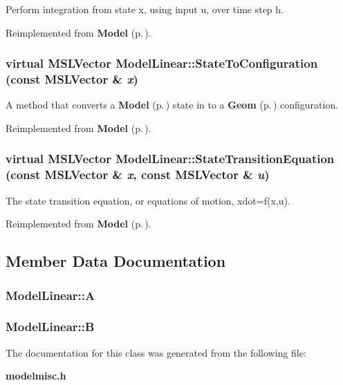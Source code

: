 Perform integration from state x, using input u, over time step h.



Reimplemented from {\bf Model} {\rm (p.\,\pageref{class_Model_a5})}.
\subsubsection{\setlength{\rightskip}{0pt plus 5cm}virtual {\bf MSLVector} Model\-Linear::State\-To\-Configuration (const {\bf MSLVector} \& {\em x})\hspace{0.3cm}{\tt  [virtual]}}\label{class_ModelLinear_a2}


A method that converts a {\bf Model} {\rm (p.\,\pageref{class_Model})} state in to a {\bf Geom} {\rm (p.\,\pageref{class_Geom})} configuration.



Reimplemented from {\bf Model} {\rm (p.\,\pageref{class_Model_a8})}.
\subsubsection{\setlength{\rightskip}{0pt plus 5cm}virtual {\bf MSLVector} Model\-Linear::State\-Transition\-Equation (const {\bf MSLVector} \& {\em x}, const {\bf MSLVector} \& {\em u})\hspace{0.3cm}{\tt  [virtual]}}\label{class_ModelLinear_a4}


The state transition equation, or equations of motion, xdot=f(x,u).



Reimplemented from {\bf Model} {\rm (p.\,\pageref{class_Model_a3})}.

\subsection{Member Data Documentation}
\subsubsection{ Model\-Linear::A}\label{class_ModelLinear_m0}


\subsubsection{ Model\-Linear::B}\label{class_ModelLinear_m1}




The documentation for this class was generated from the following file:\begin{CompactItemize}
\item 
{\bf modelmisc.h}\end{CompactItemize}
